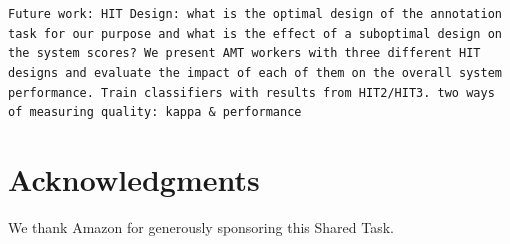 \documentclass[11pt,letterpaper]{article}
\begin{document}
  
\label{sect:conclusions}
\texttt{Future work: HIT Design: what is the optimal design of the annotation task for our purpose and what is the effect of a suboptimal design on the system scores? We present AMT workers with three different HIT designs and evaluate the impact of each of them on the overall system performance. Train classifiers with results from HIT2/HIT3. two ways of measuring quality: kappa \& performance}

\section*{Acknowledgments}
We thank Amazon for generously sponsoring this Shared Task.



\end{document}
